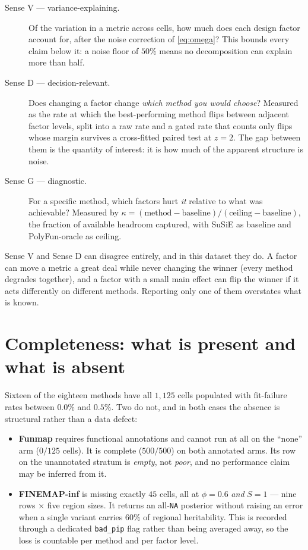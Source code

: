\documentclass[11pt,a4paper]{article}
\begin{document}
\begin{description}
\item[Sense V --- variance-explaining.] Of the variation in a metric across
cells, how much does each design factor account for, after the noise
correction of \eqref{eq:omega}? This bounds every claim below it: a noise floor
of $50\%$ means no decomposition can explain more than half.
\item[Sense D --- decision-relevant.] Does changing a factor change
\emph{which method you would choose}? Measured as the rate at which the
best-performing method flips between adjacent factor levels, split into a raw
rate and a gated rate that counts only flips whose margin survives a
cross-fitted paired test at $z=2$. The gap between them is the quantity of
interest: it is how much of the apparent structure is noise.
\item[Sense G --- diagnostic.] For a specific method, which factors hurt
\emph{it} relative to what was achievable? Measured by
$\kappa=(\text{method}-\text{baseline})/(\text{ceiling}-\text{baseline})$, the
fraction of available headroom captured, with SuSiE as baseline and
PolyFun-oracle as ceiling.
\end{description}

Sense V and Sense D can disagree entirely, and in this dataset they do. A factor
can move a metric a great deal while never changing the winner (every method
degrades together), and a factor with a small main effect can flip the winner
if it acts differently on different methods. Reporting only one of them
overstates what is known.

\section{Completeness: what is present and what is absent}\label{sec:completeness}

Sixteen of the eighteen methods have all $1{,}125$ cells populated with
fit-failure rates between $0.0\%$ and $0.5\%$. Two do not, and in both cases
the absence is structural rather than a data defect:

\begin{itemize}
\item \textbf{Funmap} requires functional annotations and cannot run at all on
the ``none'' arm ($0/125$ cells). It is complete ($500/500$) on both annotated
arms. Its row on the unannotated stratum is \emph{empty}, not \emph{poor}, and
no performance claim may be inferred from it.
\item \textbf{FINEMAP-inf} is missing exactly $45$ cells, all at
$\phi=0.6$ \emph{and} $S=1$ --- nine rows $\times$ five region sizes. It
returns an all-\texttt{NA} posterior without raising an error when a single
variant carries $60\%$ of regional heritability. This is recorded through a
dedicated \texttt{bad\_pip} flag rather than being averaged away, so the loss
is countable per method and per factor level.
\end{itemize}
\end{document}
